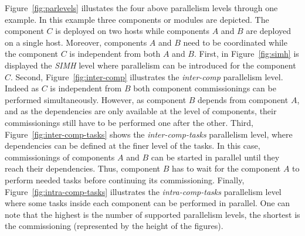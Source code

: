 Figure~\ref{fig:parlevels} illustates the four above parallelism levels
through one example. In this example three components or modules are
depicted. The component $C$ is deployed on two hosts while components
$A$ and $B$ are deployed on a single host. Moreover, components $A$
and $B$ need to be coordinated while the component $C$ is independent
from both $A$ and $B$. First, in Figure~\ref{fig:simh} is displayed
the \emph{SIMH} level where parallelism can be introduced for the
component $C$. Second, Figure~\ref{fig:inter-comp} illustrates the
\emph{inter-comp} parallelism level. Indeed as $C$ is independent from
$B$ both component commissionings can be performed
simultaneously. However, as component $B$ depends from component $A$,
and as the dependencies are only available at the level of components,
their commissionings still have to be performed one after the
other. Third, Figure~\ref{fig:inter-comp-tasks} shows the
\emph{inter-comp-tasks} parallelism level, where dependencies can be
defined at the finer level of the tasks. In this case, commissionings
of components $A$ and $B$ can be started in parallel until they reach
their dependencies. Thus, component $B$ has to wait for the component
$A$ to perform needed tasks before continuing its
commissioning. Finally, Figure~\ref{fig:intra-comp-tasks} illustrates
the \emph{intra-comp-tasks} parallelism level where some tasks inside
each component can be performed in parallel. One can note that the
highest is the number of supported parallelism levels, the shortest is
the commissioning (represented by the height of the figures).

